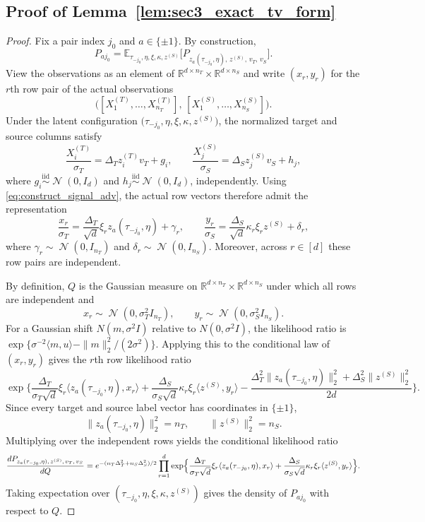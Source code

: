 \documentclass[10pt]{article}
\newcommand{\R}{\mathbb R}
\newcommand{\Ebb}{\mathbb E}
\newcommand{\ip}[2]{\langle #1,#2\rangle}
\DeclareMathOperator{\dnorm}{\mathcal N}
\newcommand{\trg}{T}
\newcommand{\nT}{n_{\trg}}
\newcommand{\sigmaT}{\sigma_{\trg}}
\newcommand{\Xtar}{X^{(\trg)}}
\newcommand{\ztar}{z^{(\trg)}}
\newcommand{\DeltaT}{\Delta_{\trg}}
\newcommand{\src}{S}
\newcommand{\nS}{n_{\src}}
\newcommand{\sigmaS}{\sigma_{\src}}
\newcommand{\Xsrc}{X^{(\src)}}
\newcommand{\zsrc}{z^{(\src)}}
\newcommand{\DeltaS}{\Delta_{\src}}
\begin{document}
\subsection{Proof of Lemma~\ref{lem:sec3_exact_tv_form}}

\begin{proof}
Fix a pair index $j_0$ and $a\in\{\pm1\}$. By construction,
\[
    P_{aj_0}
    =
    \Ebb_{\tau_{-j_0},\eta,\xi,\kappa,\zsrc}
    \bigl[
        P_{z_a(\tau_{-j_0},\eta),\,\zsrc,\,v_{\trg},\,v_{\src}}
    \bigr].
\]
View the observations as an element of
$\R^{d\times \nT}\times\R^{d\times \nS}$ and write $(x_r,y_r)$ for the $r$th
row pair of the actual observations
\[
    \bigl([\Xtar_1,\ldots,\Xtar_{\nT}],\,[\Xsrc_1,\ldots,\Xsrc_{\nS}]\bigr).
\]
Under the latent configuration
$\bigl(\tau_{-j_0},\eta,\xi,\kappa,\zsrc\bigr)$, the normalized target and source
columns satisfy
\[
    \frac{\Xtar_i}{\sigmaT}=\DeltaT \ztar_i v_{\trg}+g_i,
    \qquad
    \frac{\Xsrc_j}{\sigmaS}=\DeltaS \zsrc_j v_{\src}+h_j,
\]
where $g_i\overset{\mathrm{iid}}{\sim}\dnorm(0,I_d)$ and
$h_j\overset{\mathrm{iid}}{\sim}\dnorm(0,I_d)$, independently. Using
\eqref{eq:construct_signal_adv}, the actual row vectors therefore admit the
representation
\[
\frac{x_r}{\sigmaT}=\frac{\DeltaT}{\sqrt d}\xi_r z_a(\tau_{-j_0},\eta)+\gamma_r,
    \qquad
\frac{y_r}{\sigmaS}=\frac{\DeltaS}{\sqrt d}\kappa_r\xi_r \zsrc+\delta_r,
\]
where $\gamma_r\sim\dnorm(0,I_{\nT})$ and $\delta_r\sim\dnorm(0,I_{\nS})$.
Moreover, across $r\in[d]$ these row pairs are independent.

By definition, $Q$ is the Gaussian measure on
$\R^{d\times \nT}\times\R^{d\times \nS}$ under which all rows are independent
and
\[
    x_r\sim\dnorm(0,\sigmaT^2 I_{\nT}),
    \qquad
    y_r\sim\dnorm(0,\sigmaS^2 I_{\nS}).
\]
For a Gaussian shift $N(m,\sigma^2 I)$ relative to $N(0,\sigma^2 I)$, the
likelihood ratio is
$\exp\{\sigma^{-2}\ip{m}{u}-\|m\|_2^2/(2\sigma^2)\}$. Applying this to the conditional law of
$(x_r,y_r)$ gives the $r$th row likelihood ratio
\[
    \exp\Biggl\{
        \frac{\DeltaT}{\sigmaT\sqrt d}\xi_r
        \ip{z_a(\tau_{-j_0},\eta)}{x_r}
        +
        \frac{\DeltaS}{\sigmaS\sqrt d}\kappa_r\xi_r
        \ip{\zsrc}{y_r}
        -
        \frac{\DeltaT^2\|z_a(\tau_{-j_0},\eta)\|_2^2
        +\DeltaS^2\|\zsrc\|_2^2}{2d}
    \Biggr\}.
\]
Since every target and source label vector has coordinates in $\{\pm1\}$,
\[
    \|z_a(\tau_{-j_0},\eta)\|_2^2=\nT,
    \qquad
    \|\zsrc\|_2^2=\nS.
\]
Multiplying over the independent rows yields the conditional likelihood ratio
\[
    \frac{dP_{z_a(\tau_{-j_0},\eta),\,\zsrc,\,v_{\trg},\,v_{\src}}}{dQ}
    =
    e^{-(\nT\DeltaT^2+\nS\DeltaS^2)/2}
    \prod_{r=1}^d
    \exp\Bigl\{
        \frac{\DeltaT}{\sigmaT\sqrt d}\xi_r
        \ip{z_a(\tau_{-j_0},\eta)}{x_r}
        +
        \frac{\DeltaS}{\sigmaS\sqrt d}\kappa_r\xi_r
        \ip{\zsrc}{y_r}
    \Bigr\}.
\]
Taking expectation over $(\tau_{-j_0},\eta,\xi,\kappa,\zsrc)$ gives the density
of $P_{aj_0}$ with respect to $Q$.


\end{proof}
\end{document}
